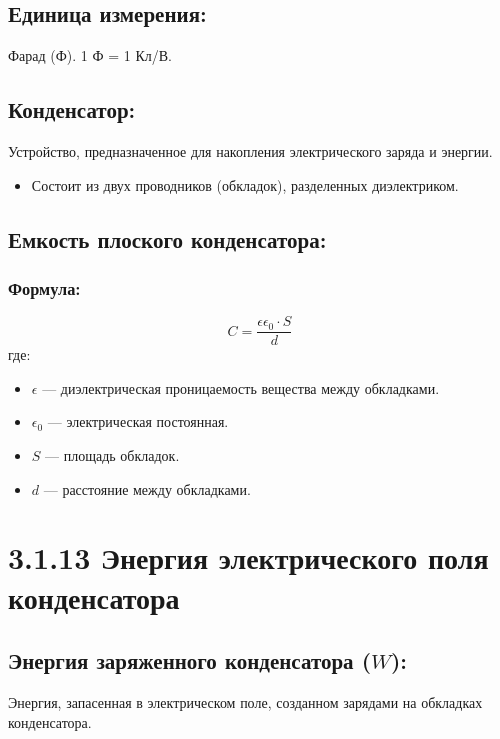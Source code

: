 \documentclass[a4paper,12pt]{article}
\begin{document}
\subsection*{Единица измерения:}
\vspace{-3pt}
Фарад (Ф). 1 Ф = 1 Кл/В.

\vspace{-9pt}
\subsection*{Конденсатор:}
\vspace{-3pt}
Устройство, предназначенное для накопления электрического заряда и энергии.
\begin{itemize}
    \item Состоит из двух проводников (обкладок), разделенных диэлектриком.
\end{itemize}

\vspace{-9pt}
\subsection*{Емкость плоского конденсатора:}
\vspace{-3pt}
\subsubsection*{Формула:}
$$ C = \frac{\epsilon \epsilon_0 \cdot S}{d} $$
где:
\begin{itemize}
    \item $\epsilon$ — диэлектрическая проницаемость вещества между обкладками.
    \item $\epsilon_0$ — электрическая постоянная.
    \item $S$ — площадь обкладок.
    \item $d$ — расстояние между обкладками.
\end{itemize}

\newpage
\section*{3.1.13 Энергия электрического поля конденсатора}

\vspace{-9pt}
\subsection*{Энергия заряженного конденсатора ($W$):}
\vspace{-3pt}
Энергия, запасенная в электрическом поле, созданном зарядами на обкладках конденсатора.
\vspace{-3pt}
\end{document}
